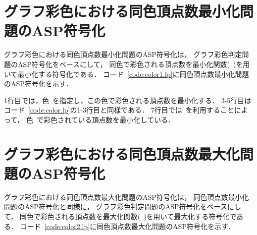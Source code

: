 \section{グラフ彩色における同色頂点数最小化問題のASP符号化}



グラフ彩色における同色頂点数最小化問題のASP符号化は，
グラフ彩色判定問題のASP符号化をベースにして，
同色で彩色される頂点数を最小化関数(~)を用いて最小化する符号化である．
コード~\ref{code:color1.lp}に同色頂点数最小化問題のASP符号化を示す．

1行目では，色~を指定し，この色で彩色される頂点数を最小化する．
3-5行目は
コード~\ref{code:color.lp}の1-3行目と同様である．
7行目では~を利用することによって，
色~で彩色されている頂点数を最小化している．

\section{グラフ彩色における同色頂点数最大化問題のASP符号化}



グラフ彩色における同色頂点数最大化問題のASP符号化は，
同色頂点数最小化問題のASP符号化と同様に，
グラフ彩色判定問題のASP符号化をベースにして，
同色で彩色される頂点数を最大化関数(~)を用いて最大化する符号化である．
コード~\ref{code:color2.lp}に同色頂点数最大化問題のASP符号化を示す．

